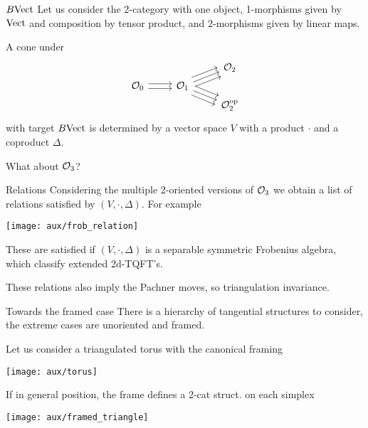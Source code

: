 \begin{frame}[fragile]{$B\mathrm{Vect}$}
	Let us consider the 2-category with one object, 1-morphisms given by $\mathrm{Vect}$ and composition by tensor product, and 2-morphisms given by linear maps.

	\pause\medskip
	A cone under
		\[
	\begin{tikzcd}[row sep=3]
		& & \cO_2 \\
		\cO_0 \arrow[r,shift left=1] \arrow[r,shift right=1] &
		\cO_1 \arrow[ru,shift left=2] \arrow[ru,shift right=2] \urar
		\arrow[rd,shift left=2] \arrow[rd,shift right=2] \drar & \\
		& & \cO_2^\op
	\end{tikzcd}
	\]
	with target $B\mathrm{Vect}$ is determined by a vector space $V$ with a product $\cdot$ and a coproduct $\Delta$.

	\pause\medskip
	 What about $\mathcal{O}_3$?
\end{frame}

\begin{frame}{Relations}
	\pause
	Considering the multiple 2-oriented versions of $\mathcal{O}_3$ we obtain a list of relations satisfied by $(V, \cdot, \Delta)$.
	\pause
	For example
	\begin{center}
		\texttt{[image: aux/frob\_relation]}
	\end{center}

	\pause
	 These are satisfied if $(V, \cdot, \Delta)$ is a separable symmetric Frobenius algebra, which classify extended 2d-TQFT's.

	\pause\medskip
	 These relations also imply the Pachner moves, so triangulation invariance.
\end{frame}

\begin{frame}{Towards the framed case}
	\pause
	There is a hierarchy of tangential structures to consider, the extreme cases are unoriented and framed.

	\pause\smallskip
	Let us consider a triangulated torus with the canonical framing
	\begin{center}
		\texttt{[image: aux/torus]}
	\end{center}

	\pause\smallskip
	If in general position, the frame defines a 2-cat struct. on each simplex
	\begin{center}
		\texttt{[image: aux/framed\_triangle]}
	\end{center}
\end{frame}

